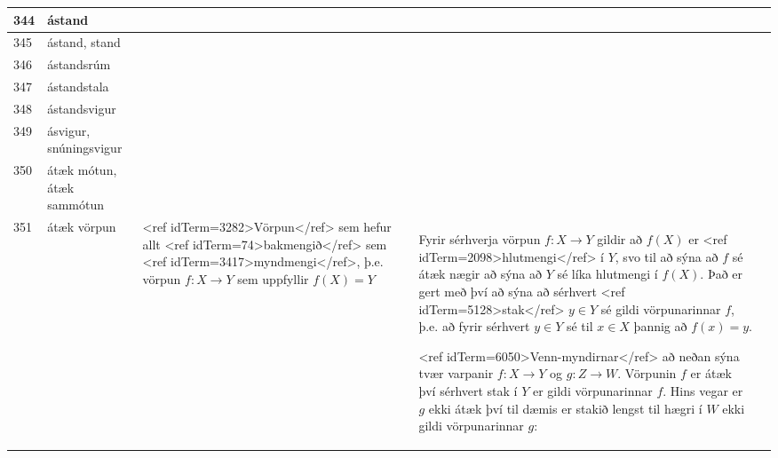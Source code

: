\begin{longtable}{p{}|p{}|p{}|p{}|p{}}
\hline
344 & ástand &  &  &  \\
\hline
345 & ástand, stand &  &  &  \\
\hline
346 & ástandsrúm &  &  &  \\
\hline
347 & ástandstala &  &  &  \\
\hline
348 & ástandsvigur &  &  &  \\
\hline
349 & ásvigur, snúningsvigur &  &  &  \\
\hline
350 & átæk mótun, átæk sammótun &  &  &  \\
\hline
351 & átæk vörpun & <ref idTerm=3282>Vörpun</ref> sem hefur allt <ref idTerm=74>bakmengið</ref> sem <ref idTerm=3417>myndmengi</ref>, þ.e. vörpun $f:X \to Y$ sem uppfyllir $f(X)=Y$ & Fyrir sérhverja vörpun $f: X \to Y$ gildir að $f(X)$ er <ref idTerm=2098>hlutmengi</ref> í $Y$, svo til að sýna að $f$ sé átæk nægir að sýna að $Y$ sé líka hlutmengi í $f(X)$. Það er gert með því að sýna að sérhvert <ref idTerm=5128>stak</ref> $y \in Y$ sé gildi vörpunarinnar $f$, þ.e. að fyrir sérhvert $y \in Y$ sé til $x \in X$ þannig að $f(x) = y$.

<ref idTerm=6050>Venn-myndirnar</ref> að neðan sýna tvær varpanir $f: X \to Y$ og $g: Z \to W$. Vörpunin $f$ er átæk því sérhvert stak í $Y$ er gildi vörpunarinnar $f$. Hins vegar er $g$ ekki átæk því til dæmis er stakið lengst til hægri í $W$ ekki gildi vörpunarinnar $g$:


\end{longtable}
